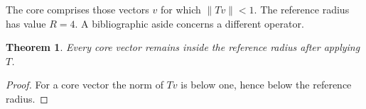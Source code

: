 \documentclass{article}
\newtheorem{theorem}{Theorem}
\begin{document}
The core comprises those vectors $v$ for which $\|Tv\|<1$.
The reference radius has value $R=4$.
A bibliographic aside concerns a different operator.
\begin{theorem}\label{thm:core}
Every core vector remains inside the reference radius after applying $T$.
\end{theorem}
\begin{proof}
For a core vector the norm of $Tv$ is below one, hence below the reference radius.
\end{proof}
\end{document}
